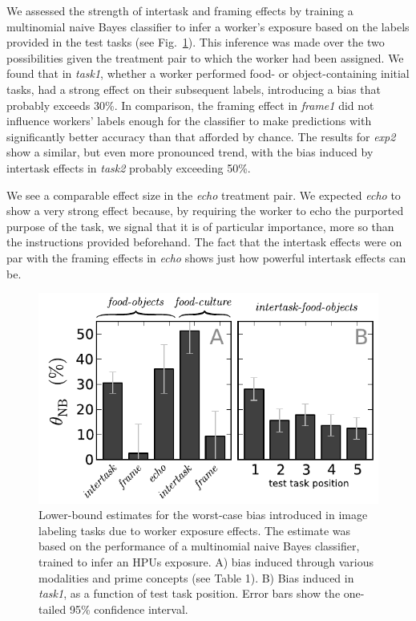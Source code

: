 \documentclass[12pt]{article}
\begin{document}
We assessed the strength of intertask and framing effects
by training a multinomial naive Bayes classifier to infer a worker's exposure
based on the labels provided in the test tasks (see Fig.~\ref{fig:theta}).
This inference was made over the two possibilities given the treatment pair
to which the worker had been assigned.
We found that in \textit{task1}, whether a worker performed food- or 
object-containing initial tasks, had a strong effect on their subsequent 
labels, introducing a bias that probably exceeds 30\%.  In comparison, the 
framing effect in \textit{frame1} did 
not influence workers' labels enough for the classifier to make predictions 
with significantly better accuracy than that afforded by chance.  The results 
for \textit{exp2} show a similar, but even more pronounced trend, with the bias
induced by intertask effects in \textit{task2} probably exceeding 50\%.

We see a comparable effect size in the \textit{echo} treatment pair.
We expected \textit{echo} to show a very strong effect because, by requiring
the worker to echo the purported purpose of the task, we signal that it
is of particular importance, more so than the instructions provided
beforehand.  The fact that the intertask effects were on par with the framing 
effects in \textit{echo} shows just how powerful intertask effects can be.

\begin{figure}
	\centering
	\includegraphics[scale=1]{figs/theta.pdf}
	\caption{
		Lower-bound estimates for the  worst-case bias introduced in image
		labeling tasks due to worker exposure effects.  The estimate was 
		based on the performance of a multinomial naive Bayes classifier,
		trained to infer an HPUs exposure. A) bias induced through various
		modalities and prime concepts (see Table 1). B) Bias induced in 
		\textit{task1}, as a function of test task position.  Error bars
		show the one-tailed 95\% confidence interval.
	}
	\label{fig:theta}
\end{figure}
\end{document}
